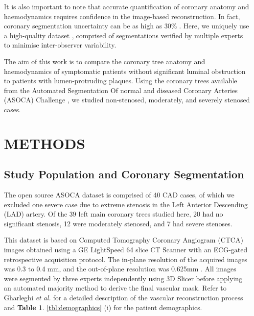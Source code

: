 \documentclass[preprint,11pt,review]{elsarticle}
\begin{document}
It is also important to note that accurate quantification of coronary anatomy and haemodynamics requires confidence in the image-based reconstruction. In fact, coronary segmentation uncertainty can be as high as 30\% \cite{Gharleghi2022Automated}. Here, we uniquely use a high-quality dataset \cite{Gharleghi2023Annotated}, comprised of segmentations verified by multiple experts to minimise inter-observer variability. 

The aim of this work is to compare the coronary tree anatomy and haemodynamics of symptomatic patients without significant luminal obstruction to patients with lumen-protruding plaques. Using the coronary trees available from the Automated Segmentation Of normal and diseased Coronary Arteries (ASOCA) Challenge \cite{Gharleghi2022Automated}, we studied non-stenosed, moderately, and severely stenosed cases. 
 
\section{METHODS}

\subsection{Study Population and Coronary Segmentation}
The open source ASOCA dataset \cite{Gharleghi2022Automated} is comprised of 40 CAD cases, of which we excluded one severe case due to extreme stenosis in the Left Anterior Descending (LAD) artery. Of the 39 left main coronary trees studied here, 20 had no significant stenosis, 12 were moderately stenosed, and 7 had severe stenoses.

This dataset is based on Computed Tomography Coronary Angiogram (CTCA) images obtained using a GE LightSpeed 64 slice CT Scanner with an ECG-gated retrospective acquisition protocol. The in-plane resolution of the acquired images was 0.3 to 0.4 mm, and the out-of-plane resolution was 0.625mm \cite{Medrano-Gracia2016computational}. All images were segmented by three experts independently using 3D Slicer \cite{Fedorov20123D}  before applying an automated majority method to derive the final vascular mask. Refer to Gharleghi \textit{et al.} \cite{Gharleghi2023Annotated} for a detailed description of the vascular reconstruction process and \textbf{Table 1}. \ref{tbl:demographics} (i) for the patient demographics. 
\end{document}
